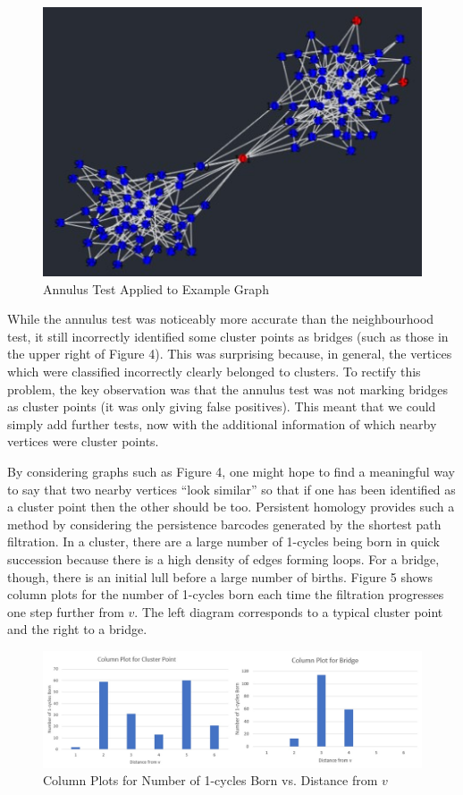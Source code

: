 \documentclass[12pt,a4paper]{amsart}
\numberwithin{equation}{section}
\theoremstyle{plain}
\theoremstyle{definition}
\begin{document}
\begin{figure}[h]
	\centering
	\caption{Annulus Test Applied to Example Graph}
	\includegraphics[scale=1]{AnnulusTest.jpg}
\end{figure}

While the annulus test was noticeably more accurate than the neighbourhood test, it still incorrectly identified some cluster points as bridges (such as those in the upper right of Figure 4). This was surprising because, in general, the vertices which were classified incorrectly clearly belonged to clusters. To rectify this problem, the key observation was that the annulus test was not marking bridges as cluster points (it was only giving false positives). This meant that we could simply add further tests, now with the additional information of which nearby vertices were cluster points. 

By considering graphs such as Figure 4, one might hope to find a meaningful way to say that two nearby vertices ``look similar'' so that if one has been identified as a cluster point then the other should be too. Persistent homology provides such a method by considering the persistence barcodes generated by the shortest path filtration. In a cluster, there are a large number of 1-cycles being born in quick succession because there is a high density of edges forming loops. For a bridge, though, there is an initial lull before a large number of births. Figure 5 shows column plots for the number of 1-cycles born each time the filtration progresses one step further from $v$. The left diagram corresponds to a typical cluster point and the right to a bridge.

\begin{figure}[h]
	\centering
	\caption{Column Plots for Number of 1-cycles Born vs. Distance from $v$}
	\includegraphics[scale=0.65]{ColumnPlots.jpg}
\end{figure}
\end{document}
